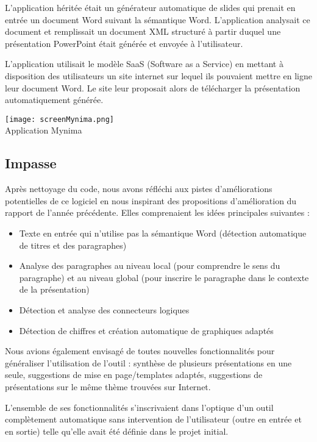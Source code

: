 \documentclass[12pt]{article}
\begin{document}
L'application héritée était un générateur automatique de slides qui prenait en entrée un document Word suivant la sémantique Word. L'application analysait ce document et remplissait un document XML structuré à partir duquel une présentation PowerPoint était générée et envoyée à l'utilisateur.

L'application utilisait le modèle SaaS (Software as a Service) en mettant à disposition des utilisateurs un site internet sur lequel ils pouvaient mettre en ligne leur document Word. Le site leur proposait alors de télécharger la présentation automatiquement générée.

\begin{center}
    \centering
    \texttt{[image: screenMynima.png]}\\
    Application Mynima
\end{center}

\subsection{Impasse}

Après nettoyage du code, nous avons réfléchi aux pistes d'améliorations potentielles de ce logiciel en nous inspirant des propositions d'amélioration du rapport de l'année précédente. Elles comprenaient les idées principales suivantes : 

\begin{itemize}
    \item Texte en entrée qui n'utilise pas la sémantique Word (détection automatique de titres et des paragraphes)
    \item Analyse des paragraphes au niveau local (pour comprendre le sens du paragraphe) et au niveau global (pour inscrire le paragraphe dans le contexte de la présentation)
    \item Détection et analyse des connecteurs logiques
    \item Détection de chiffres et création automatique de graphiques adaptés
\end{itemize}

Nous avions également envisagé de toutes nouvelles fonctionnalités pour généraliser l'utilisation de l'outil : synthèse de plusieurs présentations en une seule, suggestions de mise en page/templates adaptés, suggestions de présentations sur le même thème trouvées sur Internet.

L'ensemble de ses fonctionnalités s'inscrivaient dans l'optique d'un outil complètement automatique sans intervention de l'utilisateur (outre en entrée et en sortie) telle qu'elle avait été définie dans le projet initial. 
\end{document}
